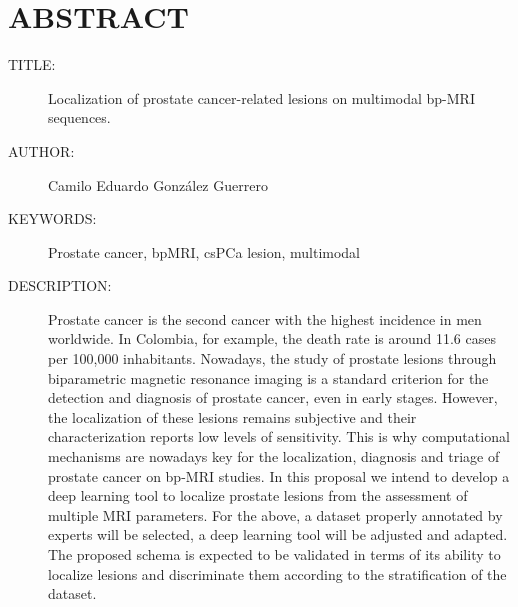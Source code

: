 \chapter*{ABSTRACT}

\footnotesize{
\begin{description}
  \item[TITLE:] Localization of prostate cancer-related lesions on multimodal bp-MRI sequences. 
  \item[AUTHOR:] Camilo Eduardo González Guerrero 
  \item[KEYWORDS:] Prostate cancer, bpMRI, csPCa lesion, multimodal
  
  \item[DESCRIPTION:] 
Prostate cancer is the second cancer with the highest incidence in men worldwide. In Colombia, for example, the death rate is around 11.6 cases per 100,000 inhabitants. Nowadays, the study of prostate lesions through biparametric magnetic resonance imaging is a standard criterion for the detection and diagnosis of prostate cancer, even in early stages. However, the localization of these lesions remains subjective and their characterization reports low levels of sensitivity. This is why computational mechanisms are nowadays key for the localization, diagnosis and triage of prostate cancer on bp-MRI studies. In this proposal we intend to develop a deep learning tool to localize prostate lesions from the assessment of multiple MRI parameters. For the above, a dataset properly annotated by experts will be selected, a deep learning tool will be adjusted and adapted. The proposed schema is expected to be validated in terms of its ability to localize lesions and discriminate them according to the stratification of the dataset.   

 


\end{description}
}\normalsize